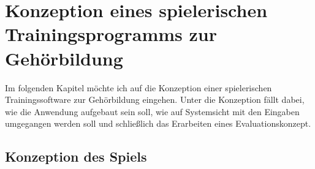 \chapter{Konzeption eines spielerischen Trainingsprogramms zur Gehörbildung}

Im folgenden Kapitel möchte ich auf die Konzeption einer spielerischen Trainingssoftware zur Gehörbildung eingehen. Unter die Konzeption fällt dabei, wie die Anwendung aufgebaut sein soll, wie auf Systemsicht mit den Eingaben umgegangen werden soll und schließlich das Erarbeiten eines Evaluationskonzept.


\section{Konzeption des Spiels}
%

